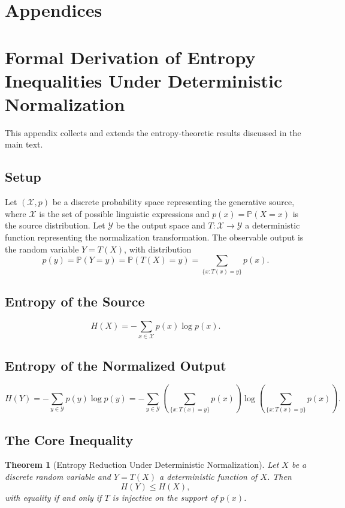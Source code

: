 \documentclass[12pt,a4paper]{article}
\theoremstyle{definition}
\theoremstyle{plain}
\newtheorem{theorem}[definition]{Theorem}
\theoremstyle{remark}
\newcommand{\calX}{\mathcal{X}}
\newcommand{\calY}{\mathcal{Y}}
\newcommand{\Prob}{\mathbb{P}}
\begin{document}
\newpage
\section*{Appendices}
\appendix

\section{Formal Derivation of Entropy Inequalities Under Deterministic Normalization}
\label{app:entropy}

This appendix collects and extends the entropy-theoretic results discussed in the main text.

\subsection{Setup}

Let $(\calX, p)$ be a discrete probability space representing the generative source, where
$\calX$ is the set of possible linguistic expressions and $p(x) = \Prob(X = x)$ is the
source distribution. Let $\calY$ be the output space and $T : \calX \to \calY$ a deterministic
function representing the normalization transformation. The observable output is the random
variable $Y = T(X)$, with distribution
\[
p(y) = \Prob(Y = y) = \Prob(T(X) = y) = \sum_{\{x : T(x) = y\}} p(x).
\]

\subsection{Entropy of the Source}

\[
H(X) = -\sum_{x \in \calX} p(x) \log p(x).
\]

\subsection{Entropy of the Normalized Output}

\[
H(Y) = -\sum_{y \in \calY} p(y) \log p(y) = -\sum_{y \in \calY}
\left(\sum_{\{x : T(x) = y\}} p(x)\right) \log \left(\sum_{\{x : T(x) = y\}} p(x)\right).
\]

\subsection{The Core Inequality}

\begin{theorem}[Entropy Reduction Under Deterministic Normalization]
Let $X$ be a discrete random variable and $Y = T(X)$ a deterministic function of $X$. Then
\[
H(Y) \leq H(X),
\]
with equality if and only if $T$ is injective on the support of $p(x)$.
\end{theorem}
\end{document}
